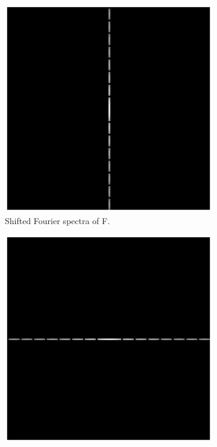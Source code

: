 \documentclass[11pt,a4paper]{article}
\begin{document}
\begin{figure}[!ht]
	\footnotesize
	\centering 
	\begin{subfigure}[t]{.32\linewidth} %
		\includegraphics[width=\columnwidth]{Linearity_Fhat_Shift_Abs_Log.eps}
		\caption{Shifted Fourier spectra of F.}
		\label{fig:Fhat_Shift_Abs_Log}
	\end{subfigure}
	\begin{subfigure}[t]{.32\linewidth} %
		\includegraphics[width=\columnwidth]{Linearity_Ghat_Shift_Abs_Log.eps}

\end{subfigure}
\end{figure}
\end{document}
